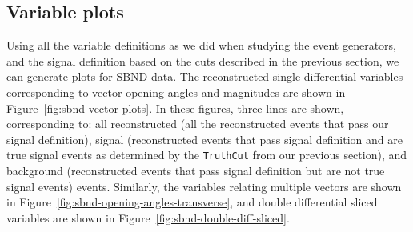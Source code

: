 \documentclass{article}
\begin{document}
\clearpage

\subsection{Variable plots}

Using all the variable definitions as we did when studying the event generators, and the signal definition based on the cuts described in the previous section, 
we can generate plots for SBND data. The reconstructed single differential variables corresponding to vector opening angles and magnitudes are shown in 
Figure~\ref{fig:sbnd-vector-plots}. In these figures, three lines are shown, corresponding to: all reconstructed (all the reconstructed events that pass our signal definition), 
signal (reconstructed events that pass signal definition and are true signal events as determined by the \verb|TruthCut| from our previous section), and background 
(reconstructed events that pass signal definition but are not true signal events) events. Similarly, the variables relating multiple vectors are shown in Figure~\ref{fig:sbnd-opening-angles-transverse}, 
and double differential sliced variables are shown in Figure~\ref{fig:sbnd-double-diff-sliced}.
\end{document}
